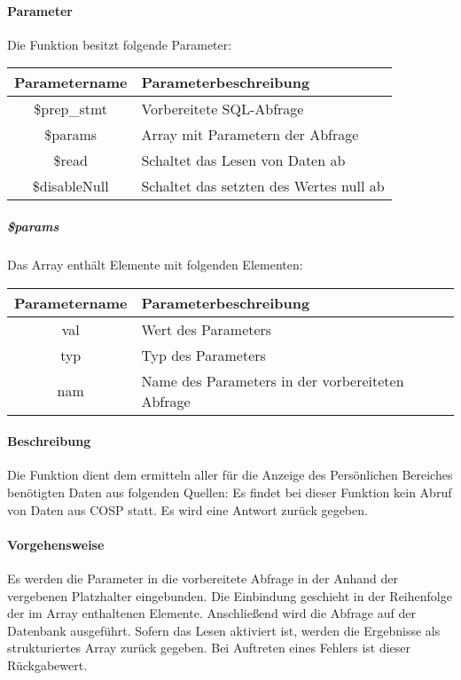 \paragraph{Parameter} Die Funktion besitzt folgende Parameter:
\begin{table}[H]
	\begin{tabular}{|c|p{11cm}|}
		\hline
		\textbf{Parametername} & \textbf{Parameterbeschreibung} \\ \hline
		\$prep\_stmt  & Vorbereitete SQL-Abfrage \\ \hline
		\$params      & Array mit Parametern der Abfrage \\ \hline
		\$read        & Schaltet das Lesen von Daten ab \\ \hline
		\$disableNull & Schaltet das setzten des Wertes {\glqq null\grqq} ab \\ \hline
	\end{tabular}
\end{table}
\subparagraph{\$params}Das Array enthält Elemente mit folgenden Elementen:
\begin{table}[H]
	\begin{tabular}{|c|p{11cm}|}
		\hline
		\textbf{Parametername} & \textbf{Parameterbeschreibung} \\ \hline
		val & Wert des Parameters \\ \hline
		typ & Typ des Parameters \\ \hline
		nam & Name des Parameters in der vorbereiteten Abfrage \\ \hline
	\end{tabular}
\end{table}
\paragraph{Beschreibung} Die Funktion dient dem ermitteln aller für die Anzeige des Persönlichen Bereiches benötigten Daten aus folgenden Quellen:
Es findet bei dieser Funktion kein Abruf von Daten aus {\glqq COSP\grqq} statt. Es wird eine Antwort zurück gegeben.
\paragraph{Vorgehensweise} Es werden die Parameter in die vorbereitete Abfrage in der Anhand der vergebenen Platzhalter eingebunden. Die Einbindung geschieht in der Reihenfolge der im Array enthaltenen Elemente. Anschließend wird die Abfrage auf der Datenbank ausgeführt. Sofern das Lesen aktiviert ist, werden die Ergebnisse als strukturiertes Array zurück gegeben. Bei Auftreten eines Fehlers ist dieser Rückgabewert.